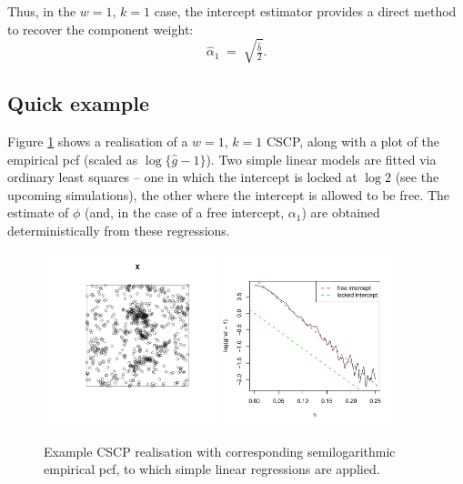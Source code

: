 \documentclass[11pt]{article}
\begin{document}
Thus, in the $w=1$, $k=1$ case, the intercept estimator provides a direct method to recover the component weight:
\begin{equation}\label{eq:ahat}
\hat{\alpha}_1 \;=\; \sqrt{\tfrac{\hat b}{2}}.
\end{equation}

\subsection{Quick example}
Figure \ref{fig:qeg} shows a realisation of a $w=1$, $k=1$ CSCP, along with a plot of the empirical pcf (scaled as $\log\{\hat{g}-1\}$). Two simple linear models are fitted via ordinary least squares -- one in which the intercept is locked at $\log 2$ (see the upcoming simulations), the other where the intercept is allowed to be free. The estimate of $\phi$ (and, in the case of a free intercept, $\alpha_1$) are obtained deterministically from these regressions.

\begin{figure}[h!]
	\centering
	\includegraphics[width=0.45\textwidth]{cscp_k1example.pdf}
	\includegraphics[width=0.45\textwidth]{cscp_k1fit.pdf}
	\caption{Example CSCP realisation with corresponding semilogarithmic empirical pcf, to which simple linear regressions are applied.}
	\label{fig:qeg}
\end{figure}
\end{document}
